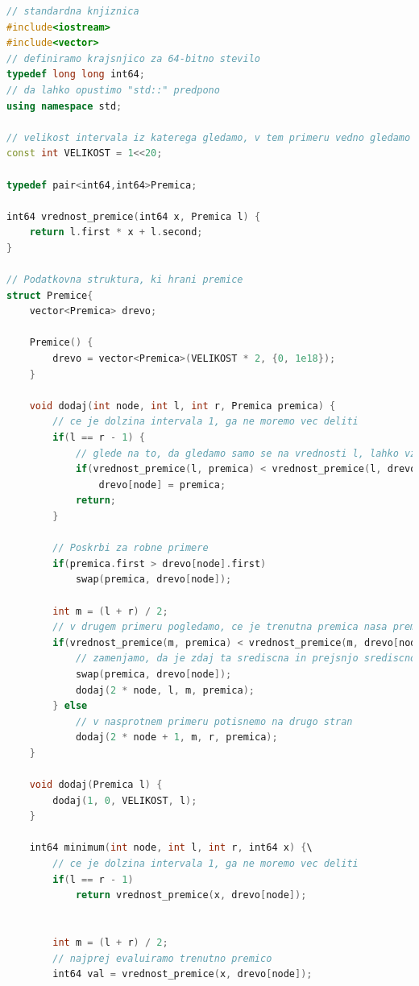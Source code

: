 \begin{lstlisting}[label={lst:code5}, language=C++]
// standardna knjiznica
#include<iostream>
#include<vector>
// definiramo krajsnjico za 64-bitno stevilo
typedef long long int64;
// da lahko opustimo "std::" predpono
using namespace std;

// velikost intervala iz katerega gledamo, v tem primeru vedno gledamo x na intervalu [1, 10^6]
const int VELIKOST = 1<<20;

typedef pair<int64,int64>Premica;

int64 vrednost_premice(int64 x, Premica l) {
    return l.first * x + l.second;
}

// Podatkovna struktura, ki hrani premice
struct Premice{
    vector<Premica> drevo;

    Premice() {
        drevo = vector<Premica>(VELIKOST * 2, {0, 1e18});
    }

    void dodaj(int node, int l, int r, Premica premica) {
        // ce je dolzina intervala 1, ga ne moremo vec deliti
        if(l == r - 1) {
            // glede na to, da gledamo samo se na vrednosti l, lahko vzamemo premico, ki ima manjso vrednost in drugo zavrzemo
            if(vrednost_premice(l, premica) < vrednost_premice(l, drevo[node]))
                drevo[node] = premica;
            return;
        }

        // Poskrbi za robne primere
        if(premica.first > drevo[node].first)
            swap(premica, drevo[node]);

        int m = (l + r) / 2;
        // v drugem primeru pogledamo, ce je trenutna premica nasa premica primerna za srediscno premico
        if(vrednost_premice(m, premica) < vrednost_premice(m, drevo[node])) {
            // zamenjamo, da je zdaj ta srediscna in prejsnjo srediscno premico potisnemo dol
            swap(premica, drevo[node]);
            dodaj(2 * node, l, m, premica);
        } else
            // v nasprotnem primeru potisnemo na drugo stran
            dodaj(2 * node + 1, m, r, premica);
    }

    void dodaj(Premica l) {
        dodaj(1, 0, VELIKOST, l);
    }

    int64 minimum(int node, int l, int r, int64 x) {\
        // ce je dolzina intervala 1, ga ne moremo vec deliti
        if(l == r - 1)
            return vrednost_premice(x, drevo[node]);


        int m = (l + r) / 2;
        // najprej evaluiramo trenutno premico
        int64 val = vrednost_premice(x, drevo[node]);


\end{lstlisting}
